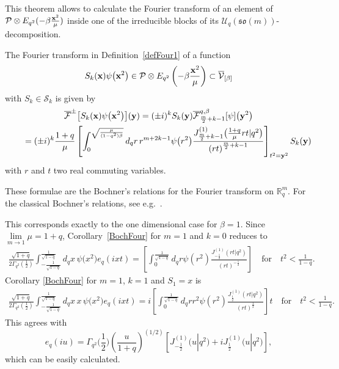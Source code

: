 \documentclass[pdftex]{sigma}
\newcommand{\mR}{\mathbb{R}}
\newcommand{\cF}{\mathcal{F}}
\newcommand{\cP}{\mathcal{P}}
\newcommand{\cS}{\mathcal{S}}
\newcommand{\cV}{\mathcal{V}}
\newcommand{\cU}{\mathcal{U}}
\numberwithin{equation}{section}
\begin{document}
This theorem allows to calculate the Fourier transform of an element of $\cP\otimes E_{q^2}(-\beta \frac{\bold{x}^2}{\mu})$ inside one of the irreducible blocks of its $\cU_q(\mathfrak{so}(m))$-decomposition.
\begin{corollary}
\label{BochFour}
The Fourier transform in Definition~{\rm \ref{defFour1}} of a function
\[
S_k(\bold{x})\psi\big(\bold{x}^2\big)\in\cP\otimes E_{q^2}\left(-\beta \frac{\bold{x}^2}{\mu}\right)\subset \overline{\cV}_{[\beta]}
\]
 with $S_k\in\cS_k$ is given by
\begin{gather*}
\overline{\cF}^\pm\big[S_k(\bold{x})\psi\big(\bold{x}^2\big)\big](\bold{y}) = (\pm i)^kS_k(\bold{y})\overline{\cF}^{q,\beta}_{\frac{m}{2}+k-1}[\psi]\big(\bold{y}^2\big)\\
\qquad{}  = (\pm i)^k\frac{1+q}{\mu}\left[\int_{0}^{\sqrt{\frac{\mu}{(1-q^2)\beta}}}d_qr \,r^{m+2k-1}\psi\big(r^2\big)\frac{J^{(1)}_{\frac{m}{2}+k-1}\big(\frac{1+q}{\mu}rt|q^2\big)}{\left(rt\right)^{\frac{m}{2}+k-1}}
\right]_{t^2=\bold{y}^2}S_k(\bold{y})
\end{gather*}
with $r$ and $t$ two real commuting variables.
\end{corollary}

These formulae are the Bochner's relations for the Fourier transform on $\mR^m_q$. For the classical Bochner's relations, see e.g.~\cite{MR1151617}.

This corresponds exactly to the one dimensional case for $\beta=1$. Since $\lim\limits_{m\to1}\mu=1+q$, Corollary~\ref{BochFour} for $m=1$ and $k=0$ reduces to
\begin{gather*}
\frac{\sqrt{1+q}}{2\Gamma_{q^2}(\frac{1}{2})}\int_{-\frac{1}{\sqrt{1-q}}}^{\frac{1}{\sqrt{1-q}}}d_qx\,\psi\big(x^2\big)e_q(ixt) = \left[\int_{0}^{\frac{1}{\sqrt{1-q}}}d_qr \psi(r^2)\frac{J^{(1)}_{-\frac{1}{2}}(rt|q^2)}{(rt)^{-\frac{1}{2}}}\right] \quad\mbox{for}\quad t^2<\frac{1}{1-q}.
\end{gather*}
Corollary \ref{BochFour} for $m=1$, $k=1$ and $S_1=x$ is
\begin{gather*}
\frac{\sqrt{1+q}}{2\Gamma_{q^2}(\frac{1}{2})}\int_{-\frac{1}{\sqrt{1-q}}}^{\frac{1}{\sqrt{1-q}}}d_qx\,x\,\psi\big(x^2\big)e_q(ixt) = i\left[ \! \int_{0}^{\frac{1}{\sqrt{1-q}}} \!\!d_qrr^2 \psi(r^2)\frac{J^{(1)}_{\frac{1}{2}} (rt|q^2 )}{(rt)^{\frac{1}{2}}}\right]t
\quad \mbox{for}\quad t^2<\frac{1}{1-q}.
\end{gather*}
This agrees with
\[
e_q(iu)=\Gamma_{q^2}\Big(\frac{1}{2}\Big)\left(\frac{u}{1+q}\right)^{(1/2)}\left[J_{-\frac{1}{2}}^{(1)}\big(u|q^2\big)
+iJ_{\frac{1}{2}}^{(1)}\big(u|q^2\big)\right],
 \]
 which can be easily calculated.
\end{document}
